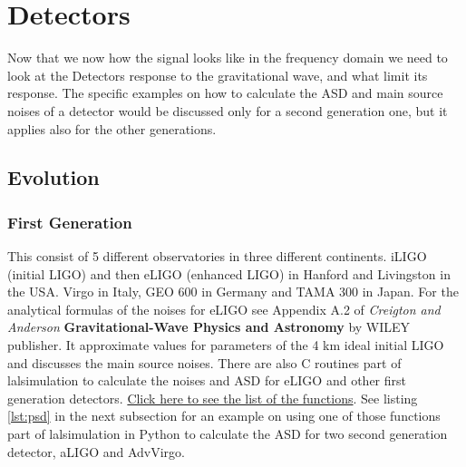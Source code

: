 \documentclass[11pt,fleqn]{book} %
\begin{document}



\section{Detectors}

Now that we now how the signal looks like in the frequency domain we need to look at the Detectors response to the gravitational wave, and what limit its response. The specific examples on how to calculate the ASD and main source noises of a detector would be discussed only for a second generation one, but it applies also for the other generations. 


\subsection{Evolution}

\vspace{.3 cm}
\subsubsection{First Generation}
\vspace{.3 cm}

This consist of 5 different observatories in three different continents. iLIGO (initial LIGO) and then eLIGO (enhanced LIGO) in Hanford and Livingston in the USA. Virgo in Italy, GEO 600 in Germany and TAMA 300 in Japan.  For the analytical formulas of the noises for eLIGO see Appendix A.2 of \emph{Creigton and Anderson} \textbf{Gravitational-Wave Physics and Astronomy} by WILEY publisher. It approximate values for parameters of the 4 km ideal initial LIGO and discusses the main source noises. There are also C routines part of lalsimulation to calculate the noises and ASD for eLIGO and other first generation detectors. \href{https://ligo-vcs.phys.uwm.edu/cgit/lalsuite/tree/lalsimulation/src/LALSimNoisePSD.c}{Click here to see the list of the functions}. See listing \ref{lst:psd} in the next subsection for an example on using one of those functions part of lalsimulation in Python to calculate the ASD for two second generation detector, aLIGO and AdvVirgo. \\
\end{document}
